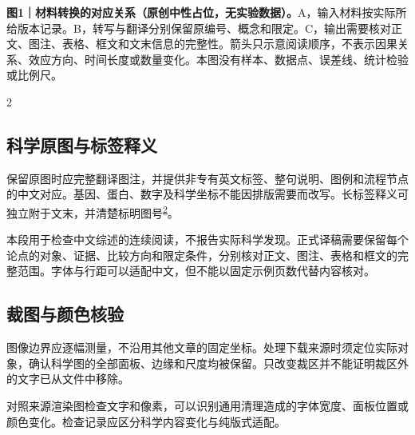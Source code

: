\documentclass[UTF8,fontset=none,scheme=plain]{ctexart}
\renewcommand{\normalsize}{\fontsize{9.05bp}{12.1bp}\selectfont}
\newcommand{\NRCite}[1]{\textsuperscript{\hyperlink{ref:#1}{#1}}}
\newenvironment{NRColumns}{\begin{multicols}{2}\normalsize}{\end{multicols}}
\newcommand{\NeutralParagraph}{本段用于检查中文综述的连续阅读，不报告实际科学发现。正式译稿需要保留每个论点的对象、证据、比较方向和限定条件，分别核对正文、图注、表格和框文的完整范围。字体与行距可以适配中文，但不能以固定示例页数代替内容核对。\par}
\begin{document}
\vspace{5bp}\noindent\begin{minipage}{\linewidth}\centering
{}\par\vspace{6bp}
{\sffamily\fontsize{7.6bp}{9.2bp}\selectfont\raggedright\textbf{图1｜材料转换的对应关系（原创中性占位，无实验数据）。}A，输入材料按实际所给版本记录。B，转写与翻译分别保留原编号、概念和限定。C，输出需要核对正文、图注、表格、框文和文末信息的完整性。箭头只示意阅读顺序，不表示因果关系、效应方向、时间长度或数量变化。本图没有样本、数据点、误差线、统计检验或比例尺。\par}
\end{minipage}\vspace{7bp}
\begin{NRColumns}
\subsection*{科学原图与标签释义}
保留原图时应完整翻译图注，并提供非专有英文标签、整句说明、图例和流程节点的中文对应。基因、蛋白、数字及科学坐标不能因排版需要而改写。长标签释义可独立附于文末，并清楚标明图号\NRCite{2}。\par
\NeutralParagraph
\subsection*{裁图与颜色核验}
图像边界应逐幅测量，不沿用其他文章的固定坐标。处理下载来源时须定位实际对象，确认科学图的全部面板、边缘和尺度均被保留。只改变裁区并不能证明裁区外的文字已从文件中移除。\par
对照来源渲染图检查文字和像素，可以识别通用清理造成的字体宽度、面板位置或颜色变化。检查记录应区分科学内容变化与纯版式适配。
\end{NRColumns}
\clearpage
\end{document}
